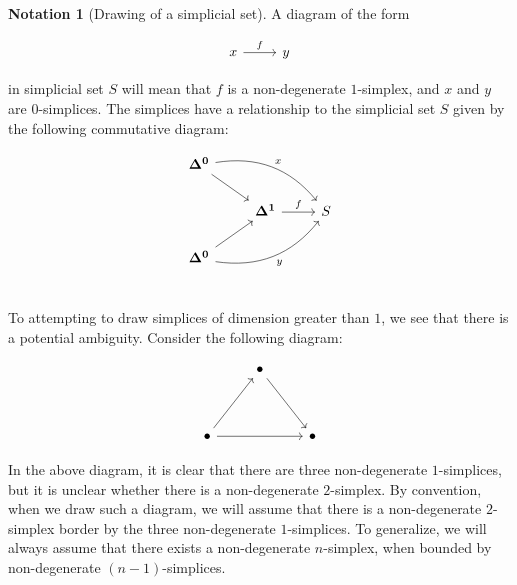 \documentclass[10pt]{amsart}
\newcommand{\Simplex}[1]{\ensuremath{\boldsymbol{\Delta^{#1}}}}
\theoremstyle{definition}
\newtheorem{notation}[definition]{Notation}
\numberwithin{definition}{subsection}
\numberwithin{definition}{section}
\begin{document}
\begin{notation}[Drawing of a simplicial set\label{not:drawsset}]
  A diagram of the form

  \begin{equation*}
    \begin{tikzcd}
      x \arrow[r, "f"] & y
    \end{tikzcd}
  \end{equation*}

  in simplicial set $S$ will mean that $f$ is a non-degenerate $1$-simplex, and $x$ and $y$ are $0$-simplices. The simplices have a relationship to the simplicial set $S$ given by the following commutative diagram:

  \begin{equation*}
    \begin{tikzcd}
      \Simplex{0} \arrow[dr] \arrow[drr, "x", bend left] & & \\
      & \Simplex{1} \arrow[r, "f"] & S \\
      \Simplex{0} \arrow[ur] \arrow[urr, "y"', bend right] & & \\
    \end{tikzcd}
  \end{equation*}

  To attempting to draw simplices of dimension greater than $1$, we see that there is a potential ambiguity. Consider the following diagram:

  \begin{equation*}
    \begin{tikzcd}
      & \bullet \arrow[ddr] & \\
      \\
      \bullet \arrow[uur] \arrow[rr] & & \bullet
    \end{tikzcd}
  \end{equation*}

  In the above diagram, it is clear that there are three non-degenerate $1$-simplices, but it is unclear whether there is a non-degenerate $2$-simplex. By convention, when we draw such a diagram, we will assume that there is a non-degenerate $2$-simplex border by the three non-degenerate $1$-simplices. To generalize, we will always assume that there exists a non-degenerate $n$-simplex, when bounded by non-degenerate $(n - 1)$-simplices.
\end{notation}
\end{document}
